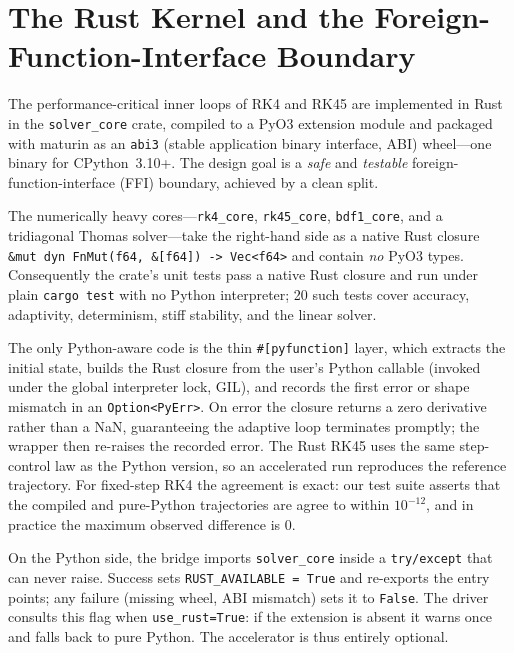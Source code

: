 \documentclass[sigplan,nonacm,screen,review]{acmart}
\begin{document}
\section{The Rust Kernel and the Foreign-Function-Interface Boundary}
\label{sec:rust}

The performance-critical inner loops of RK4 and RK45 are implemented in Rust in
the \texttt{solver\_core} crate, compiled to a PyO3 extension module and packaged
with maturin as an \texttt{abi3} (stable application binary interface, ABI) wheel---one
binary for CPython~3.10+. The design goal is a \emph{safe} and \emph{testable}
foreign-function-interface (FFI) boundary, achieved by a clean split.

The numerically heavy cores---\texttt{rk4\_core}, \texttt{rk45\_core},
\texttt{bdf1\_core}, and a tridiagonal Thomas solver---take the right-hand side as
a native Rust closure \lstinline[language=myrust]|&mut dyn FnMut(f64, &[f64]) -> Vec<f64>|
and contain \emph{no} PyO3 types. Consequently the crate's unit tests pass a
native Rust closure and run under plain \texttt{cargo test} with no Python
interpreter; 20 such tests cover accuracy, adaptivity, determinism, stiff
stability, and the linear solver.

The only Python-aware code is the thin \lstinline[language=myrust]|#[pyfunction]|
layer, which extracts the initial state, builds the Rust closure from the user's
Python callable (invoked under the global interpreter lock, GIL), and records the
first error or shape
mismatch in an \lstinline[language=myrust]|Option<PyErr>|. On error the closure
returns a zero derivative rather than a NaN, guaranteeing the adaptive loop
terminates promptly; the wrapper then re-raises the recorded error. The Rust
RK45 uses the same step-control law as the Python version, so an accelerated run
reproduces the reference trajectory. For fixed-step RK4 the agreement is exact:
our test suite asserts that the compiled and pure-Python trajectories are
agree to within $10^{-12}$, and in practice the maximum observed difference is
$0$.

On the Python side, the bridge imports \texttt{solver\_core} inside a
\texttt{try/except} that can never raise. Success sets
\texttt{RUST\_AVAILABLE = True} and re-exports the entry points; any failure
(missing wheel, ABI mismatch) sets it to \texttt{False}. The driver consults this
flag when \texttt{use\_rust=True}: if the extension is absent it warns once and
falls back to pure Python. The accelerator is thus entirely optional.
\end{document}
